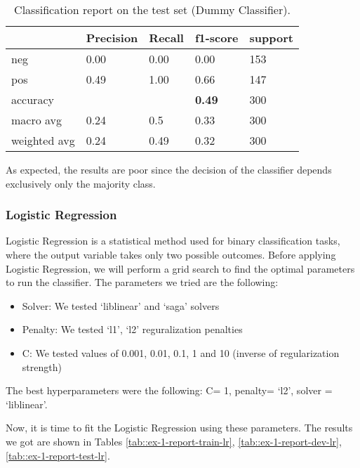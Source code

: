 \documentclass[10pt, a4paper]{article}
\begin{document}
	\begin{table}
		\begin{tabular}{|l|l|l|l|l|}
			\hline
			\cellcolor{blue!25}\textbf{} & \cellcolor{blue!25}\textbf{Precision} &
			\cellcolor{blue!25}\textbf{Recall}  &
			\cellcolor{blue!25}\textbf{f1-score}  &
			\cellcolor{blue!25}\textbf{support}\\
			\hline
			neg & 0.00 & 0.00 & 0.00 & 153 \\\hline
			pos & 0.49  & 1.00 & 0.66 & 147 \\\hline
			accuracy & & & \textbf{0.49} & 300 \\\hline
			macro avg & 0.24 & 0.5 & 0.33 & 300 \\\hline
			weighted avg & 0.24 & 0.49 & 0.32 & 300 \\\hline
			
		\end{tabular}
		\centering
		\caption{Classification report on the test set (Dummy Classifier).}
		\label{tab::ex-1-report-test-dummy}
	\end{table}
	
	
	As expected, the results are poor since the decision of the classifier depends exclusively only the majority class.
	
	\subsubsection{Logistic Regression}
	Logistic Regression is a statistical method used for binary classification tasks, where the output variable takes only two possible outcomes.
	Before applying Logistic Regression, we will perform a grid search to find the optimal parameters to run the classifier. The parameters we tried are the following:
	\begin{itemize}
		\item{Solver: We tested ‘liblinear’ and ‘saga’ solvers}
		\item{Penalty: We tested ‘l1’, ‘l2’ reguralization penalties}
		\item{C: We tested values of 0.001, 0.01, 0.1, 1 and 10 (inverse of regularization strength)}
	\end{itemize}
	
	The best hyperparameters were the following:
	C= 1, penalty= ‘l2’, solver = ‘liblinear’.
	
	Now, it is time to fit the Logistic Regression using these parameters. The results we got are shown in Tables \ref{tab::ex-1-report-train-lr}, \ref{tab::ex-1-report-dev-lr}, \ref{tab::ex-1-report-test-lr}.
	
\end{document}
